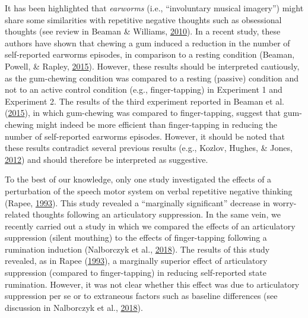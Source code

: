 \documentclass[a4paper,12pt,twoside,openright,oldfontcommands]{memoir}
\begin{document}
It has been highlighted that \emph{earworms} (i.e., \enquote{involuntary musical imagery}) might share some similarities with repetitive negative thoughts such as obsessional thoughts (see review in Beaman \& Williams, \protect\hyperlink{ref-Beaman2010}{2010}). In a recent study, these authors have shown that chewing a gum induced a reduction in the number of self-reported earworms episodes, in comparison to a resting condition (Beaman, Powell, \& Rapley, \protect\hyperlink{ref-Beaman2015}{2015}). However, these results should be interpreted cautiously, as the gum-chewing condition was compared to a resting (passive) condition and not to an active control condition (e.g., finger-tapping) in Experiment 1 and Experiment 2. The results of the third experiment reported in Beaman et al. (\protect\hyperlink{ref-Beaman2015}{2015}), in which gum-chewing was compared to finger-tapping, suggest that gum-chewing might indeed be more efficient than finger-tapping in reducing the number of self-reported earworms episodes. However, it should be noted that these results contradict several previous results (e.g., Kozlov, Hughes, \& Jones, \protect\hyperlink{ref-kozlov_gummed-up_2012}{2012}) and should therefore be interpreted as suggestive.

To the best of our knowledge, only one study investigated the effects of a perturbation of the speech motor system on verbal repetitive negative thinking (Rapee, \protect\hyperlink{ref-rapee_utilisation_1993}{1993}). This study revealed a \enquote{marginally significant} decrease in worry-related thoughts following an articulatory suppression. In the same vein, we recently carried out a study in which we compared the effects of an articulatory suppression (silent mouthing) to the effects of finger-tapping following a rumination induction (Nalborczyk et al., \protect\hyperlink{ref-nalborczyk_articulatory_2018}{2018}). The results of this study revealed, as in Rapee (\protect\hyperlink{ref-rapee_utilisation_1993}{1993}), a marginally superior effect of articulatory suppression (compared to finger-tapping) in reducing self-reported state rumination. However, it was not clear whether this effect was due to articulatory suppression per se or to extraneous factors such as baseline differences (see discussion in Nalborczyk et al., \protect\hyperlink{ref-nalborczyk_articulatory_2018}{2018}).
\end{document}
